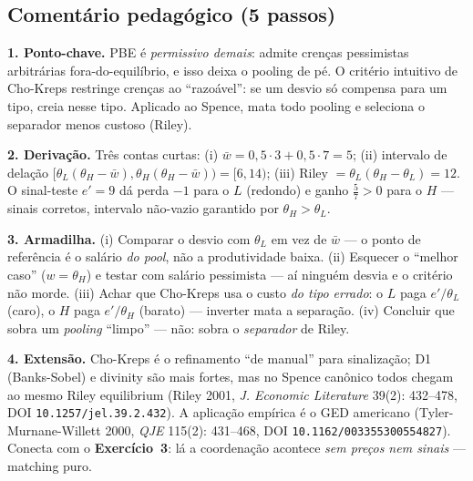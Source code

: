 \documentclass[11pt,a4paper]{article}
\newcommand{\dc}[2]{#1{,}#2}
\newcommand{\passo}[1]{\smallskip\noindent\textbf{\textcolor{insper}{#1}}\quad}
\begin{document}
\subsection*{Comentário pedagógico (5 passos)}
\begin{gabarito}
\passo{1. Ponto-chave.} PBE é \emph{permissivo demais}: admite crenças pessimistas arbitrárias
fora-do-equilíbrio, e isso deixa o pooling de pé. O critério intuitivo de Cho-Kreps restringe
crenças ao ``razoável'': se um desvio só compensa para um tipo, creia nesse tipo. Aplicado ao
Spence, mata todo pooling e seleciona o separador menos custoso (Riley).

\passo{2. Derivação.} Três contas curtas: (i) $\bar w=\dc{0}{5}\cdot3+\dc{0}{5}\cdot7=5$;
(ii) intervalo de delação $[\theta_L(\theta_H-\bar w),\theta_H(\theta_H-\bar w))=[6,14)$;
(iii) Riley $=\theta_L(\theta_H-\theta_L)=12$. O sinal-teste $e'=9$ dá perda $-1$ para o $L$
(redondo) e ganho $\tfrac57>0$ para o $H$ — sinais corretos, intervalo não-vazio garantido por
$\theta_H>\theta_L$.

\passo{3. Armadilha.} (i) Comparar o desvio com $\theta_L$ em vez de $\bar w$ — o ponto de
referência é o salário \emph{do pool}, não a produtividade baixa. (ii) Esquecer o ``melhor
caso'' ($w=\theta_H$) e testar com salário pessimista — aí ninguém desvia e o critério não morde.
(iii) Achar que Cho-Kreps usa o custo \emph{do tipo errado}: o $L$ paga $e'/\theta_L$ (caro), o
$H$ paga $e'/\theta_H$ (barato) — inverter mata a separação. (iv) Concluir que sobra um
\emph{pooling} ``limpo'' — não: sobra o \emph{separador} de Riley.

\passo{4. Extensão.} Cho-Kreps é o refinamento ``de manual'' para sinalização; D1
(Banks-Sobel) e divinity são mais fortes, mas no Spence canônico todos chegam ao mesmo Riley
equilibrium (Riley 2001, \emph{J. Economic Literature} 39(2): 432--478,
DOI \texttt{10.1257/jel.39.2.432}). A aplicação empírica é o GED americano
(Tyler-Murnane-Willett 2000, \emph{QJE} 115(2): 431--468, DOI
\texttt{10.1162/003355300554827}). Conecta com o \textbf{Exercício~3}: lá a coordenação
acontece \emph{sem preços nem sinais} — matching puro.


\end{gabarito}
\end{document}
